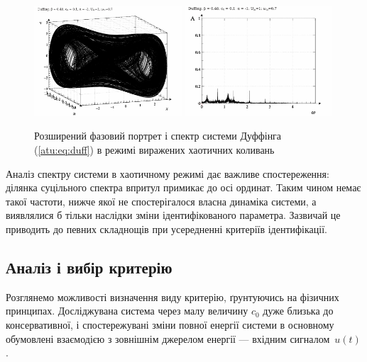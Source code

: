 \begin{figure}[ht!]
\begin{center}
  \includegraphics[width=0.49\textwidth]{p/cha/duff/duff_p_1x00_0x70_0x48.png}
  \hfill
  \includegraphics[width=0.49\textwidth]{p/cha/duff/duff_f_1x00_0x70_0x48.png}
\end{center}
\caption{Розширений фазовий портрет і спектр системи Дуффінга (\ref{atu:eq:duff}) в режимі виражених хаотичних коливань}
\label{atu:f:duff_phase_f_chaos2}
\end{figure}

Аналіз спектру системи в хаотичному режимі дає важливе
спостереження: ділянка суцільного спектра впритул примикає
до осі ординат. Таким чином немає такої частоти, нижче якої
не спостерігалося власна динаміка системи, а виявлялися б
тільки наслідки зміни ідентифікованого параметра.
Зазвичай це приводить до певних
складнощів при усередненні критеріїв ідентифікації.


\subsection{Аналіз і вибір критерію} %

Розглянемо можливості визначення виду критерію, ґрунтуючись на
фізичних принципах. Досліджувана система через малу величину
\(c_0\) дуже близька до консервативної, і спостережувані зміни
повної енергії системи в основному обумовлені взаємодією з
зовнішнім джерелом енергії --- вхідним сигналом~$u(t)$.

